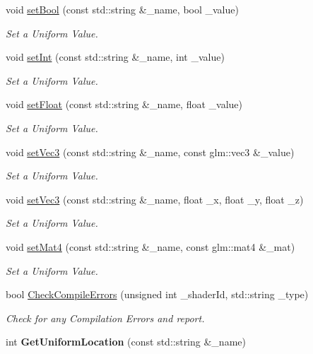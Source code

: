 \begin{DoxyCompactItemize}
void \mbox{\hyperlink{classpiolot_1_1_g_l_shader_a8f3349b73adbb3f7d85b847ffc39d0f3}{set\+Bool}} (const std\+::string \&\+\_\+name, bool \+\_\+value)
\begin{DoxyCompactList}\small\item\em Set a Uniform Value. \end{DoxyCompactList}\item 
void \mbox{\hyperlink{classpiolot_1_1_g_l_shader_a5b8fd3a108bf576243a1e852872edf5c}{set\+Int}} (const std\+::string \&\+\_\+name, int \+\_\+value)
\begin{DoxyCompactList}\small\item\em Set a Uniform Value. \end{DoxyCompactList}\item 
void \mbox{\hyperlink{classpiolot_1_1_g_l_shader_af6323e1d0956064de4c43ef4fa41b0f1}{set\+Float}} (const std\+::string \&\+\_\+name, float \+\_\+value)
\begin{DoxyCompactList}\small\item\em Set a Uniform Value. \end{DoxyCompactList}\item 
void \mbox{\hyperlink{classpiolot_1_1_g_l_shader_a47d614244dc667768a36b9cea1675eca}{set\+Vec3}} (const std\+::string \&\+\_\+name, const glm\+::vec3 \&\+\_\+value)
\begin{DoxyCompactList}\small\item\em Set a Uniform Value. \end{DoxyCompactList}\item 
void \mbox{\hyperlink{classpiolot_1_1_g_l_shader_a293369149f4ad507543cb0fcd783afd1}{set\+Vec3}} (const std\+::string \&\+\_\+name, float \+\_\+x, float \+\_\+y, float \+\_\+z)
\begin{DoxyCompactList}\small\item\em Set a Uniform Value. \end{DoxyCompactList}\item 
void \mbox{\hyperlink{classpiolot_1_1_g_l_shader_a56d846ae1d7c6adc579c5de37db02546}{set\+Mat4}} (const std\+::string \&\+\_\+name, const glm\+::mat4 \&\+\_\+mat)
\begin{DoxyCompactList}\small\item\em Set a Uniform Value. \end{DoxyCompactList}\item 
bool \mbox{\hyperlink{classpiolot_1_1_g_l_shader_ab2badc2b316c708bf6ea7a4ff39db254}{Check\+Compile\+Errors}} (unsigned int \+\_\+shader\+Id, std\+::string \+\_\+type)
\begin{DoxyCompactList}\small\item\em Check for any Compilation Errors and report. \end{DoxyCompactList}\item 
\mbox{\label{classpiolot_1_1_g_l_shader_ac5bf2e67deb4f816e82a50bbe1f168dd}} 
int {\bfseries Get\+Uniform\+Location} (const std\+::string \&\+\_\+name)
\end{DoxyCompactItemize}
